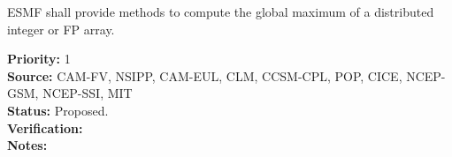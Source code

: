 








ESMF shall provide methods to compute the global maximum of a
distributed integer or FP array.

\begin{reqlist}
{\bf Priority:} 1\\ 
{\bf Source:} CAM-FV, NSIPP, CAM-EUL, CLM, CCSM-CPL, POP, CICE, NCEP-GSM, NCEP-SSI, MIT \\
{\bf Status:} Proposed. \\
{\bf Verification:} \\
{\bf Notes:}
\end{reqlist}


